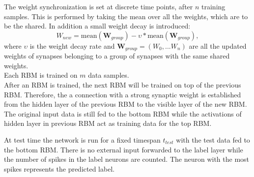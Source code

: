 The weight synchronization is set at discrete time points, after $n$ training samples.
This is performed by taking the mean over all the weights, which are to be the shared.
In addition a small weight decay is introduced:
\[
W_{new} = \text{mean}(\textbf{W}_{group}) - \upsilon * \text{mean}(\textbf{W}_{group}) , 
\]
where $\upsilon$ is the weight decay rate and $\textbf{W}_{group} = (W_0 ,... W_n)$ are all the updated weights of synapses belonging to a group of synapses with the same shared weights.
\\
Each RBM is trained on $m$ data samples.
\\
After an RBM is trained, the next RBM will be trained on top of the previous RBM.
Therefore, the a connection with a strong synaptic weight is established from the hidden layer of the previous RBM to the visible layer of the new RBM.
The original input data is still fed to the bottom RBM while the activations of hidden layer in previous RBM act as training data for the top RBM.


At test time the network is run for a fixed timespan $t_{test}$ with the test data fed to the bottom RBM.
There is no external input forwarded to the label layer while the number of spikes in the label neurons are counted.
The neuron with the most spikes represents the predicted label.  

 